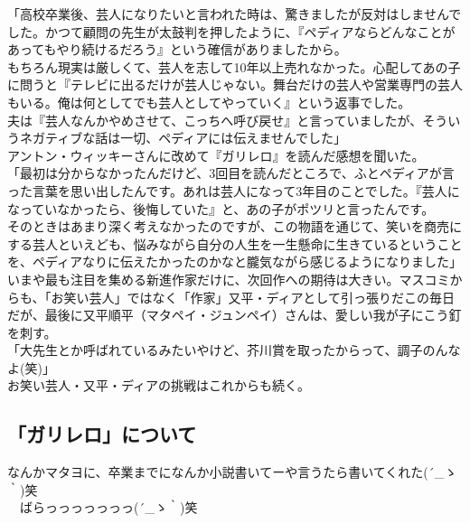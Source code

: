 「高校卒業後、芸人になりたいと言われた時は、驚きましたが反対はしませんでした。かつて顧問の先生が太鼓判を押したように、『ペディアならどんなことがあってもやり続けるだろう』という確信がありましたから。\\

もちろん現実は厳しくて、芸人を志して10年以上売れなかった。心配してあの子に問うと『テレビに出るだけが芸人じゃない。舞台だけの芸人や営業専門の芸人もいる。俺は何としてでも芸人としてやっていく』という返事でした。\\

夫は『芸人なんかやめさせて、こっちへ呼び戻せ』と言っていましたが、そういうネガティブな話は一切、ペディアには伝えませんでした」\\

アントン・ウィッキーさんに改めて『ガリレロ』を読んだ感想を聞いた。\\

「最初は分からなかったんだけど、3回目を読んだところで、ふとペディアが言った言葉を思い出したんです。あれは芸人になって3年目のことでした。『芸人になっていなかったら、後悔していた』と、あの子がポツリと言ったんです。\\

そのときはあまり深く考えなかったのですが、この物語を通じて、笑いを商売にする芸人といえども、悩みながら自分の人生を一生懸命に生きているということを、ペディアなりに伝えたかったのかなと朧気ながら感じるようになりました」\\

いまや最も注目を集める新進作家だけに、次回作への期待は大きい。マスコミからも、「お笑い芸人」ではなく「作家」又平・ディアとして引っ張りだこの毎日だが、最後に又平順平（マタペイ・ジュンペイ）さんは、愛しい我が子にこう釘を刺す。\\

「大先生とか呼ばれているみたいやけど、芥川賞を取ったからって、調子のんなよ(笑)」\\

お笑い芸人・又平・ディアの挑戦はこれからも続く。\\

\subsection{「ガリレロ」について}
なんかマタヨに、卒業までになんか小説書いてーや言うたら書いてくれた\sf(´\_ゝ｀)笑\\
　ばらっっっっっっっ\sf(´\_ゝ｀)笑

